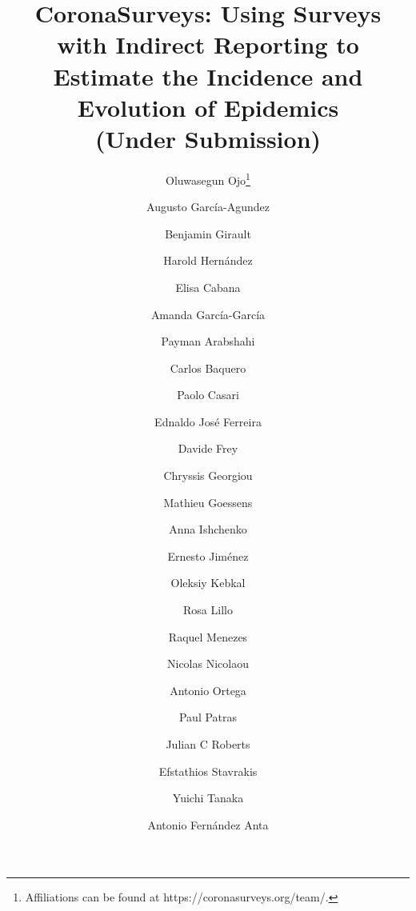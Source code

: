 \documentclass{article}
\newcommand{\footremember}[2]{%
}
\newcommand{\footrecall}[1]{%
}
\begin{document}
\title{CoronaSurveys: Using Surveys with Indirect Reporting to Estimate the Incidence and Evolution of Epidemics\\(Under Submission)}


\author{
Oluwasegun Ojo\footnote{Affiliations can be found at https://coronasurveys.org/team/.}
\footremember{imdea}{IMDEA Networks Institute, Spain}\footremember{uc3m}{UC3M, Spain}
\and Augusto García-Agundez\footremember{tud}{TU Darmstadt, Germany}
\and Benjamin Girault\footremember{usc}{USC, USA}
\and Harold Hernández\footrecall{uc3m}
\and Elisa Cabana\footrecall{imdea}
\and Amanda García-García\footrecall{imdea}
\and Payman Arabshahi\footremember{uw}{U. of Washington, USA}
\and Carlos Baquero\footremember{um}{U. Minho, Portugal}\footremember{inesc}{INESC TEC, Portugal}
\and Paolo Casari\footremember{utr}{U. of Trento, Italy}
\and Ednaldo José Ferreira\footremember{embrapa}{Embrapa Instrumentation, Brazil}
\and Davide Frey\footremember{inria}{Inria Rennes, France}
\and Chryssis Georgiou\footremember{ucy}{U. Cyprus, Cyprus}
\and Mathieu Goessens\footremember{cf}{Consulting, France}
\and Anna Ishchenko\footremember{ntuu}{National Technical University of Ukraine ``Igor Sikorsky Kyiv Polytechnic Institute'', Ukraine}
\and Ernesto Jiménez\footremember{upm}{UPM, Spain}
\and Oleksiy Kebkal\footremember{evo}{EvoLogics, Germany}
\and Rosa Lillo\footrecall{uc3m}
\and Raquel Menezes\footrecall{um}
\and Nicolas Nicolaou\footremember{algo}{Algolysis Ltd, Cyprus}
\and Antonio Ortega\footrecall{usc}
\and Paul Patras\footremember{edi}{U. Edinburgh, UK}
\and Julian C Roberts\footremember{sky}{Skyhaven Media, UK}
\and Efstathios Stavrakis\footrecall{algo}
\and Yuichi Tanaka\footremember{tuat}{Tokyo University of Agriculture and Technology, Japan}
\and Antonio Fernández Anta\footrecall{imdea}
}

\date{}

\maketitle
\end{document}
